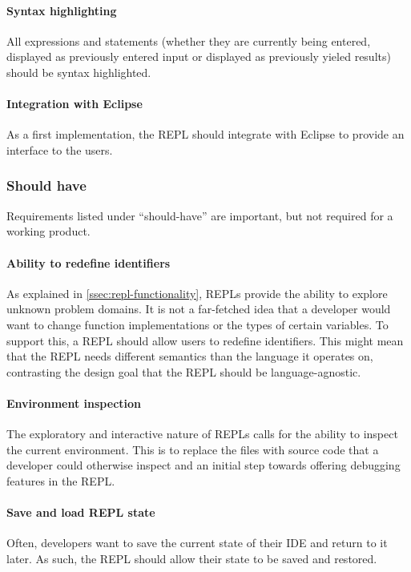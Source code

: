 \paragraph{Syntax highlighting} All expressions and statements (whether they are
currently being entered, displayed as previously entered input or displayed as
previously yieled results) should be syntax highlighted.

\paragraph{Integration with Eclipse} As a first implementation, the REPL should
integrate with Eclipse to provide an interface to the users.

\subsubsection{Should have}

Requirements listed under ``should-have'' are important, but not required for
a working product.

\paragraph{Ability to redefine identifiers} As explained in \cref{ssec:repl-functionality},
REPLs provide the ability to explore unknown problem domains. It is not a
far-fetched idea that a developer would want to change function implementations
or the types of certain variables. To support this, a REPL should allow users to
redefine identifiers. This might mean that the REPL needs different semantics
than the language it operates on, contrasting the design goal that the REPL
should be language-agnostic.

\paragraph{Environment inspection} The exploratory and interactive nature of
REPLs calls for the ability to inspect the current environment. This is to
replace the files with source code that a developer could otherwise inspect and
an initial step towards offering debugging features in the REPL.

\paragraph{Save and load REPL state} Often, developers want to save the current
state of their IDE and return to it later. As such, the REPL should allow their
state to be saved and restored.

